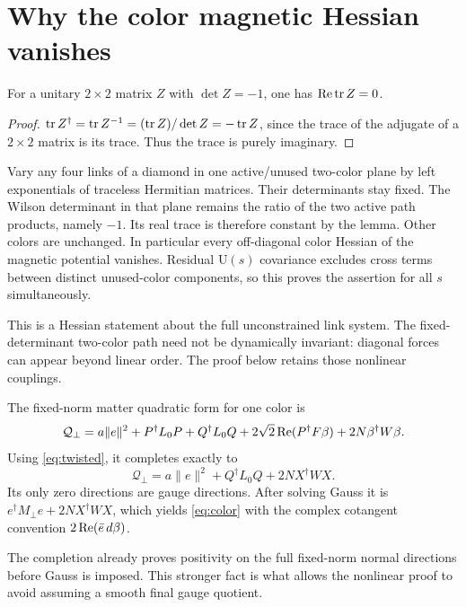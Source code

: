 \documentclass[11pt,a4paper]{article}
\begin{document}
\section{Why the color magnetic Hessian vanishes}
\begin{lemma}\label{lem:det}
For a unitary $2\times2$ matrix $Z$ with $\det Z=-1$, one has $\operatorname{Re}\operatorname{tr} Z=0$.
\end{lemma}
\begin{proof}
$\operatorname{tr} Z^\dagger=\operatorname{tr} Z^{-1}=(\operatorname{tr} Z)/\det Z=-\operatorname{tr} Z$, since the trace of the adjugate of a $2\times2$ matrix is its trace. Thus the trace is purely imaginary.
\end{proof}
Vary any four links of a diamond in one active/unused two-color plane by left exponentials of traceless Hermitian matrices. Their determinants stay fixed. The Wilson determinant in that plane remains the ratio of the two active path products, namely $-1$. Its real trace is therefore constant by the lemma. Other colors are unchanged. In particular every off-diagonal color Hessian of the magnetic potential vanishes. Residual $\mathrm U(s)$ covariance excludes cross terms between distinct unused-color components, so this proves the assertion for all $s$ simultaneously.

This is a Hessian statement about the full unconstrained link system. The fixed-determinant two-color path need not be dynamically invariant: diagonal forces can appear beyond linear order. The proof below retains those nonlinear couplings.

The fixed-norm matter quadratic form for one color is
\[
\mathcal Q_\perp=a\|e\|^2+P^\dagger L_0P+Q^\dagger L_0Q
+2\sqrt2\operatorname{Re}(P^\dagger F\beta)+2N\beta^\dagger W\beta.
\]
Using \eqref{eq:twisted}, it completes exactly to
\begin{equation}
\boxed{\mathcal Q_\perp=a\|e\|^2+Q^\dagger L_0Q+2NX^\dagger WX.}
\label{eq:completion}
\end{equation}
Its only zero directions are gauge directions. After solving Gauss it is
$e^\dagger M_\perp e+2NX^\dagger WX$, which yields \eqref{eq:color} with the complex cotangent convention $2\operatorname{Re}(\bar e\,d\beta)$.

The completion already proves positivity on the full fixed-norm normal directions before Gauss is imposed. This stronger fact is what allows the nonlinear proof to avoid assuming a smooth final gauge quotient.

\newpage
\end{document}
